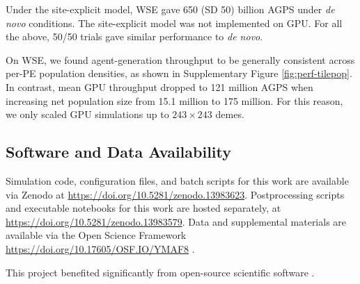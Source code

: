 Under the site-explicit model, WSE gave 650 (SD 50) billion AGPS under \textit{de novo} conditions.
The site-explicit model was not implemented on GPU.
For all the above, 50/50 trials gave similar performance to \textit{de novo}.

On WSE, we found agent-generation throughput to be generally consistent across per-PE population densities, as shown in Supplementary Figure \ref{fig:perf-tilepop}.
In contrast, mean GPU throughput dropped to 121 million AGPS when increasing net population size from 15.1 million to 175 million.
For this reason, we only scaled GPU simulations up to $243 \times 243$ demes.

\subsection{Software and Data Availability} \label{sec:materials}

Simulation code, configuration files, and batch scripts for this work are available via Zenodo at \url{https://doi.org/10.5281/zenodo.13983623}.
Postprocessing scripts and executable notebooks for this work are hosted separately, at \url{https://doi.org/10.5281/zenodo.13983579}.
Data and supplemental materials are available via the Open Science Framework \url{https://doi.org/10.17605/OSF.IO/YMAF8} \citep{foster2017open}.

This project benefited significantly from open-source scientific software \citep{2020SciPy-NMeth,harris2020array,reback2020pandas,mckinney-proc-scipy-2010,waskom2021seaborn,hunter2007matplotlib,moreno2023teeplot}.
